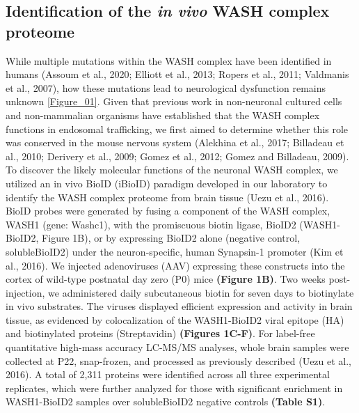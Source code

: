 
\subsection{Identification of the \textit{in vivo} WASH complex proteome}

While multiple mutations within the WASH complex have been identified in humans 
(Assoum et al., 2020; Elliott et al., 2013; Ropers et al., 2011; 
Valdmanis et al., 2007), how these mutations lead to neurological
dysfunction remains unknown \ref{Figure_01}. Given that previous work in
non-neuronal cultured cells and non-mammalian organisms have established that
the WASH complex functions in endosomal trafficking, we first aimed to determine
whether this role was conserved in the mouse nervous system (Alekhina et al.,
2017; Billadeau et al., 2010; Derivery et al., 2009; Gomez et al., 2012; Gomez
and Billadeau, 2009). To discover the likely molecular functions of the neuronal
WASH complex, we utilized an in vivo BioID (iBioID) paradigm developed in our
laboratory to identify the WASH complex proteome from brain tissue (Uezu et al.,
2016). BioID probes were generated by fusing a component of the WASH complex,
WASH1 (gene: Washc1), with the promiscuous biotin ligase, BioID2 (WASH1-BioID2,
Figure 1B), or by expressing BioID2 alone (negative control, solubleBioID2)
under the neuron-specific, human Synapsin-1 promoter (Kim et al., 2016). We
injected adenoviruses (AAV) expressing these constructs into the cortex of
wild-type postnatal day zero (P0) mice \textbf{(Figure 1B)}. Two weeks post-injection, we
administered daily subcutaneous biotin for seven days to biotinylate in vivo
substrates. The viruses displayed efficient expression and activity in brain
tissue, as evidenced by colocalization of the WASH1-BioID2 viral epitope (HA)
and biotinylated proteins (Streptavidin) \textbf{(Figures 1C-F)}. For label-free
quantitative high-mass accuracy LC-MS/MS analyses, whole brain samples were
collected at P22, snap-frozen, and processed as previously described (Uezu et
al., 2016). A total of 2,311 proteins were identified across all three
experimental replicates, which were further analyzed for those with significant
enrichment in WASH1-BioID2 samples over solubleBioID2 negative controls 
\textbf{(Table S1)}. 


